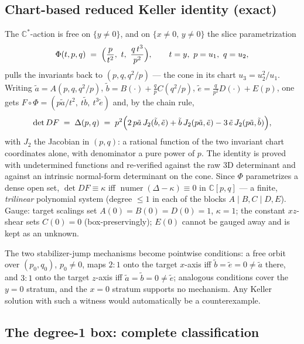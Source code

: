 \documentclass[11pt]{article}
\theoremstyle{definition}
\theoremstyle{remark}
\newcommand{\C}{\mathbb{C}}
\begin{document}
\subsection{Chart-based reduced Keller identity (exact)}

The $\C^*$-action is free on $\{y\ne 0\}$, and on $\{x\ne0,\,y\ne0\}$
the slice parametrization
\[
\Phi(t,p,q) \;=\; \Bigl(\frac{p}{t^2},\ t,\ \frac{q\,t^3}{p^2}\Bigr),
\qquad t = y,\ p = u_1,\ q = u_2,
\]
pulls the invariants back to $(p, q, q^2/p)$ --- the cone in its chart
$u_3 = u_2^2/u_1$. Writing $\tilde a = A(p,q,q^2/p)$,
$\tilde b = B(\cdot) + \tfrac{q}{p}C(q^2/p)$,
$\tilde e = \tfrac{q}{p^2}D(\cdot) + E(p)$, one gets
$F\circ\Phi = (p\tilde a/t^2,\ t\tilde b,\ t^3\tilde e)$ and, by the
chain rule,
\begin{equation}\label{eq:213identity}
\det DF \;=\; \Delta(p,q) \;=\;
p^2\Bigl(2\,p\tilde a\,J_2(\tilde b,\tilde e)
 + \tilde b\,J_2(p\tilde a,\tilde e)
 - 3\,\tilde e\,J_2(p\tilde a,\tilde b)\Bigr),
\end{equation}
with $J_2$ the Jacobian in $(p,q)$: a rational function of the two
invariant chart coordinates alone, with denominator a pure power of
$p$. The identity is proved with undetermined functions and re-verified
against the raw 3D determinant and against an intrinsic normal-form
determinant on the cone. Since $\Phi$ parametrizes a dense open set,
$\det DF \equiv \kappa$ iff
$\operatorname{numer}(\Delta-\kappa) \equiv 0$ in $\C[p,q]$ --- a finite,
\emph{trilinear} polynomial system (degree $\le 1$ in each of the blocks
$A \mid B,C \mid D,E$). Gauge: target scalings set $A(0)=B(0)=D(0)=1$,
$\kappa = 1$; the constant $xz$-shear sets $C(0)=0$ (box-preservingly);
$E(0)$ cannot be gauged away and is kept as an unknown.

The two stabilizer-jump mechanisms become pointwise conditions: a free
orbit over $(p_0,q_0)$, $p_0\ne0$, maps $2{:}1$ onto the target
$x$-axis iff $\tilde b = \tilde e = 0 \ne \tilde a$ there, and $3{:}1$
onto the target $z$-axis iff $\tilde a = \tilde b = 0 \ne \tilde e$;
analogous conditions cover the $y=0$ stratum, and the $x=0$ stratum
supports no mechanism. Any Keller solution with such a witness would
automatically be a counterexample.

\subsection{The degree-1 box: complete classification}
\end{document}
